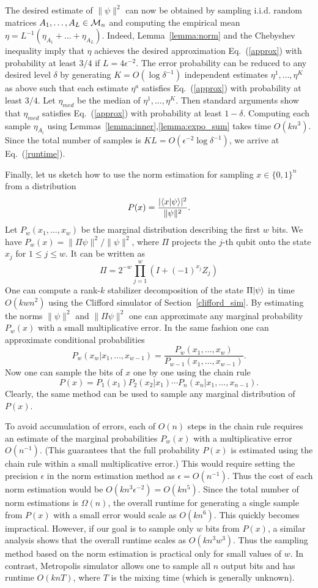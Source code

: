The desired estimate of $\|\psi\|^2$ can now be obtained by sampling
i.i.d. random matrices $A_1,\ldots,A_L\in {\cal M }_n$ and computing the empirical mean
$\eta= L^{-1}(\eta_{A_1}+\ldots +\eta_{A_L})$. Indeed, 
Lemma~\ref{lemma:norm} and the Chebyshev inequality imply that
$\eta$ achieves the desired approximation Eq.~(\ref{approx})
with probability at least $3/4$ if $L=4\epsilon^{-2}$. 
The error probability can be reduced to any desired level $\delta$
by generating $K=O(\log{\delta^{-1}})$ independent estimates $\eta^1,\ldots,\eta^K$
as above such that each estimate $\eta^a$ 
satisfies  Eq.~(\ref{approx}) with probability at least $3/4$.
Let $\eta_{med}$ be the median of $\eta^1,\ldots,\eta^K$.
Then standard arguments show that $\eta_{med}$ satisfies Eq.~(\ref{approx}) with probability at least $1-\delta$.
Computing each sample $\eta_{A_i}$ using Lemmas~\ref{lemma:inner},\ref{lemma:expo_sum} takes time $O(kn^3)$.
Since the total number of samples 
is $KL=O(\epsilon^{-2}\log{\delta^{-1}})$, we arrive at Eq.~(\ref{runtime}).


Finally, let us sketch how to use the norm estimation for sampling 
$x\in \{0,1\}^n$ from  a distribution 
\[
P(x)=\frac{|\langle x|\psi\rangle|^2}{\|\psi\|^2}.
\] 
Let $P_w(x_1,\ldots,x_w)$ be the marginal distribution  describing the first $w$
bits. We have $P_w(x)=\| \Pi \psi\|^2/\|\psi\|^2$, where
$\Pi$ projects the $j$-th qubit onto the state $x_j$ for $1\le j\le w$.
It can be written as 
\[
\Pi=2^{-w} \prod_{j=1}^w (I+(-1)^{x_j}Z_j)
\]
One can compute a rank-$k$ stabilizer decomposition of 
the state $\Pi |\psi\rangle$ in time $O(kw n^2)$ using the Clifford simulator
of Section~\ref{clifford_sim}. 
By estimating the norms $\|\psi\|^2$ and $\|\Pi \psi\|^2$
one can approximate any
marginal probability $P_w(x)$ with a small multiplicative error.
In the same fashion one can approximate conditional probabilities
\[
P_w(x_w|x_1,\ldots,x_{w-1})=\frac{P_w(x_1,\ldots,x_w)}{P_{w-1}(x_1,\ldots,x_{w-1})}.
\]
Now one can sample the bits of $x$ one by one using the chain rule
\[
P(x)=P_1(x_1)P_2(x_2|x_1)\cdots P_n(x_n|x_1,\ldots,x_{n-1}).
\]
Clearly, the same method can be used to sample any marginal distribution of $P(x)$.

To avoid accumulation of errors, each of $O(n)$ steps in the chain rule requires an estimate
of the marginal probabilities  $P_w(x)$ with a multiplicative error $O(n^{-1})$.
(This guarantees that the full probability $P(x)$ is estimated using the chain rule
within a small multiplicative error.) 
This would require setting the precision $\epsilon$ in the norm estimation method as
$\epsilon=O(n^{-1})$. Thus the cost of each norm estimation would be $O(k n^3 \epsilon^{-2}) =O(k n^5)$.
Since the total number of norm estimations is $\Omega(n)$, the overall
runtime for generating a single sample from $P(x)$ with a small error would scale as
$O(k n^6)$. This quickly becomes impractical. 
However,  if our goal is to sample only $w$ bits from $P(x)$, a similar analysis
shows that the overall runtime scales as $O(k n^3 w^3)$.
Thus the sampling method based on the norm estimation is practical only for small values of $w$.
In contrast, Metropolis simulator allows one to sample all $n$ output bits
and has runtime  $O(k nT)$, where $T$ is the mixing time (which is generally unknown).


